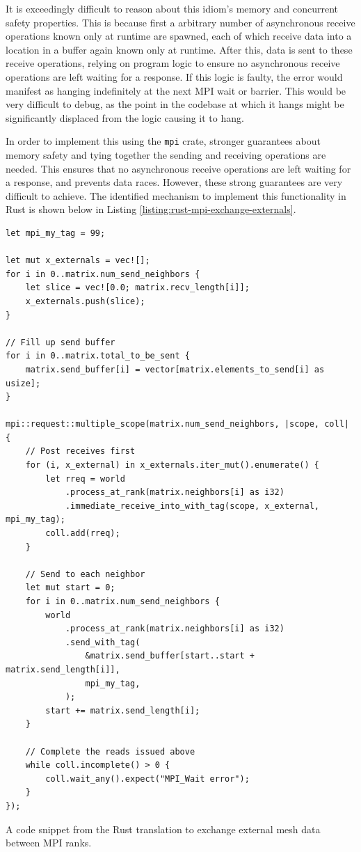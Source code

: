 It is exceedingly difficult to reason about this idiom's memory and concurrent safety properties. This is because first a arbitrary number of asynchronous receive operations known only at runtime are spawned, each of which receive data into a location in a buffer again known only at runtime. After this, data is sent to these receive operations, relying on program logic to ensure no asynchronous receive operations are left waiting for a response. If this logic is faulty, the error would manifest as hanging indefinitely at the next MPI wait or barrier. This would be very difficult to debug, as the point in the codebase at which it hangs might be significantly displaced from the logic causing it to hang.

In order to implement this using the \texttt{mpi} crate, stronger guarantees about memory safety and tying together the sending and receiving operations are needed. This ensures that no asynchronous receive operations are left waiting for a response, and prevents data races. However, these strong guarantees are very difficult to achieve. The identified mechanism to implement this functionality in Rust is shown below in Listing \ref{listing:rust-mpi-exchange-externals}.

\begin{code}
    \begin{verbatim}
let mpi_my_tag = 99;

let mut x_externals = vec![];
for i in 0..matrix.num_send_neighbors {
    let slice = vec![0.0; matrix.recv_length[i]];
    x_externals.push(slice);
}

// Fill up send buffer
for i in 0..matrix.total_to_be_sent {
    matrix.send_buffer[i] = vector[matrix.elements_to_send[i] as usize];
}

mpi::request::multiple_scope(matrix.num_send_neighbors, |scope, coll| {
    // Post receives first
    for (i, x_external) in x_externals.iter_mut().enumerate() {
        let rreq = world
            .process_at_rank(matrix.neighbors[i] as i32)
            .immediate_receive_into_with_tag(scope, x_external, mpi_my_tag);
        coll.add(rreq);
    }

    // Send to each neighbor
    let mut start = 0;
    for i in 0..matrix.num_send_neighbors {
        world
            .process_at_rank(matrix.neighbors[i] as i32)
            .send_with_tag(
                &matrix.send_buffer[start..start + matrix.send_length[i]],
                mpi_my_tag,
            );
        start += matrix.send_length[i];
    }
    
    // Complete the reads issued above
    while coll.incomplete() > 0 {
        coll.wait_any().expect("MPI_Wait error");
    }
});
    \end{verbatim}
    \caption{A code snippet from the Rust translation to exchange external mesh data between MPI ranks.}
    \label{listing:rust-mpi-exchange-externals}
\end{code}

